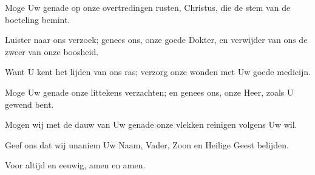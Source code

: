 \documentclass[12pt,twoside,a5paper]{article}
\begin{document}
\begin{halfparskip}

  Moge Uw genade op onze overtredingen rusten, Christus, die de stem van de boeteling bemint.

  Luister naar ons verzoek; genees ons, onze goede Dokter, en verwijder van ons de zweer van onze boosheid.

  Want U kent het lijden van ons ras; verzorg onze wonden met Uw goede medicijn.

  Moge Uw genade onze littekens verzachten; en genees ons, onze Heer, zoals U gewend bent.

  Mogen wij met de dauw van Uw genade onze vlekken reinigen volgens Uw wil.

  Geef ons dat wij unaniem Uw Naam, Vader, Zoon en Heilige Geest belijden.

  Voor altijd en eeuwig, amen en amen.
\end{halfparskip}
\end{document}
